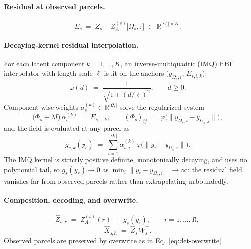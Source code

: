 \documentclass[11pt]{article}
\numberwithin{equation}{section}
\begin{document}
\paragraph{Residual at observed parcels.}
\begin{equation}
  \label{eq:tprior-residual}
  E_s \;=\; Z_s - Z_A^{(s)}\!\bigl[\Omega_s,:\bigr]
        \;\in\; \mathbb{R}^{|\Omega_s|\times K}.
\end{equation}

\paragraph{Decaying-kernel residual interpolation.}
For each latent component $k = 1,\dots,K$, an inverse-multiquadric (IMQ) RBF
interpolator with length scale $\ell$ is fit on the anchors
$\bigl(y_{\Omega_s,i},\, E_{s,i,k}\bigr)$:
\begin{equation}
  \label{eq:tprior-imq}
  \varphi(d) \;=\; \frac{1}{\sqrt{1 + (d/\ell)^2}}, \qquad d \geq 0.
\end{equation}
Component-wise weights $\alpha_s^{(k)} \in \mathbb{R}^{|\Omega_s|}$ solve the
regularized system
\begin{equation}
  \label{eq:tprior-rbf-fit}
  \bigl(\Phi_s + \lambda I\bigr)\,\alpha_s^{(k)} \;=\; E_{s,:,k},
  \qquad
  (\Phi_s)_{ij} \;=\; \varphi\!\bigl(\|y_{\Omega_s,i} - y_{\Omega_s,j}\|\bigr),
\end{equation}
and the field is evaluated at any parcel as
\begin{equation}
  \label{eq:tprior-rbf-eval}
  g_{s,k}(y_r) \;=\;
    \sum_{i=1}^{|\Omega_s|} \alpha_{s,i}^{(k)}\,
    \varphi\!\bigl(\|y_r - y_{\Omega_s,i}\|\bigr).
\end{equation}
The IMQ kernel is strictly positive definite, monotonically decaying, and uses no
polynomial tail, so $g_s(y_r) \to 0$ as
$\min_i \|y_r - y_{\Omega_s,i}\| \to \infty$: the residual field vanishes far
from observed parcels rather than extrapolating unboundedly.

\paragraph{Composition, decoding, and overwrite.}
\begin{equation}
  \label{eq:tprior-compose}
  \hat{Z}_{s,r} \;=\; Z_A^{(s)}(r) \;+\; g_s(y_r), \qquad r = 1,\dots,R,
\end{equation}
\begin{equation}
  \label{eq:tprior-decode}
  \hat{X}_{s,h} \;=\; \hat{Z}_s\, W_s^{\top}.
\end{equation}
Observed parcels are preserved by overwrite as in Eq.~\eqref{eq:det-overwrite}.
\end{document}
